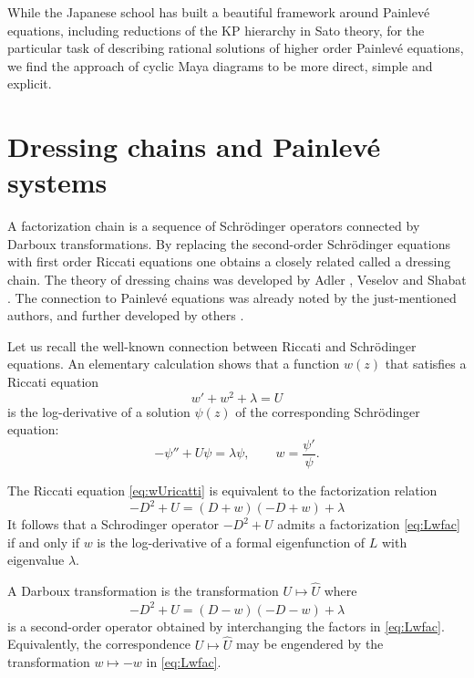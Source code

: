 \documentclass{amsart}
\theoremstyle{definition}
\newcommand{\hU}{\hat{U}}
\begin{document}
While the Japanese school has built a beautiful framework around
Painlev\'e equations, including reductions of the KP hierarchy in Sato
theory, for the particular task of describing rational solutions of
higher order Painlev\'e equations, we find the approach of cyclic Maya
diagrams to be more direct, simple and explicit.




\section{ Dressing chains and Painlev\'e systems}\label{sec:dressing}


A factorization chain is a sequence of Schr\"odinger operators
connected by Darboux transformations.  By replacing the second-order
Schr\"odinger equations with first order Riccati equations one obtains
a closely related called a dressing chain.  The theory of dressing
chains was developed by Adler \cite{adler1994nonlinear}, Veselov and
Shabat \cite{veselov1993dressing}. The connection to Painlev\'e
equations was already noted by the just-mentioned authors, and further
developed by others \cite{takasaki2003spectral,bermudez2012complexb}.

Let us recall the well-known connection between Riccati and
Schr\"odinger equations. An elementary calculation shows that a
function $w(z)$ that satisfies a Riccati equation
\begin{equation}
  \label{eq:wUricatti}
 w' + w^2+\lambda = U 
\end{equation}
is the log-derivative of a solution $\psi(z)$ of the corresponding
Schr\"odinger equation:
\begin{equation}
  \label{eq:Lipsii}
  -\psi'' + U\psi =\lambda \psi,\qquad w =  \frac{\psi'}{\psi}.
\end{equation}

The Riccati equation \eqref{eq:wUricatti} is equivalent to the
factorization relation
\begin{equation}
  \label{eq:Lwfac}
 -D^2 + U = (D+w)(-D+w)+\lambda 
\end{equation}
It follows that a Schrodinger operator $-D^2+U$ admits a factorization
\eqref{eq:Lwfac} if and only if $w$ is the log-derivative of a formal
eigenfunction of $L$ with eigenvalue $\lambda$.


A Darboux transformation is the transformation $U\mapsto \hU$ where
\[ -D^2+\hU = (D-w)(-D-w)+\lambda \] is a second-order operator
obtained by interchanging the factors in \eqref{eq:Lwfac}.
Equivalently, the correspondence $U\mapsto \hU$ may be engendered by
the transformation $w\mapsto -w$ in \eqref{eq:Lwfac}.
\end{document}
